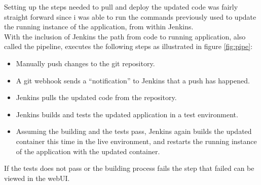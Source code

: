 Setting up the steps needed to pull and deploy the updated code was fairly straight forward since i was able to run the commands previously used to update the running instance of the application, from within Jenkins.\\
With the inclusion of Jenkins the path from code to running application, also called the pipeline, executes the following steps as illustrated in figure \ref{fig:pipe}:
\begin{itemize}
	\item Manually push changes to the git repository.
	\item A git webhook sends a ``notification'' to Jenkins that a push has happened.
	\item Jenkins pulls the updated code from the repository.
	\item Jenkins builds and tests the updated application in a test environment.
	\item Assuming the building and the tests pass, Jenkins again builds the updated container this time in the live environment, and restarts the running instance of the application with the updated container.
\end{itemize}
If the tests does not pass or the building process fails the step that failed can be viewed in the webUI.
